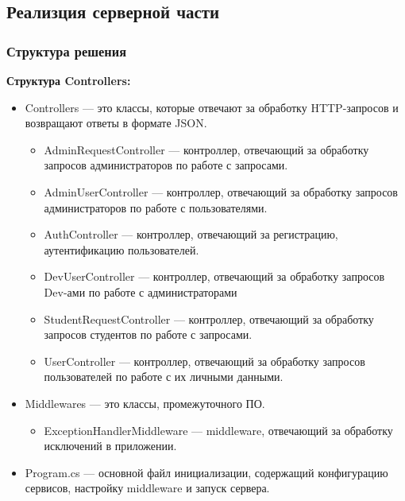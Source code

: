 \subsection{Реализция серверной части}

\subsubsection{Структура решения}

\textbf{Структура Controllers:}
\begin{itemize}
	\item{Controllers --- это классы, которые отвечают за обработку HTTP-запросов и возвращают ответы в формате JSON.
			\begin{itemize}
				\item{AdminRequestController --- контроллер, отвечающий за обработку запросов администраторов по работе с запросами.}
				\item{AdminUserController --- контроллер, отвечающий за обработку запросов администраторов по работе с пользователями.}
				\item{AuthController --- контроллер, отвечающий за регистрацию, аутентификацию пользователей.}
				\item{DevUserController --- контроллер, отвечающий за обработку запросов Dev-ами по работе с администраторами}
				\item{StudentRequestController --- контроллер, отвечающий за обработку запросов студентов по работе с запросами.}
				\item{UserController --- контроллер, отвечающий за обработку запросов пользователей по работе с их личными данными.}
			\end{itemize}
		}
	\item{Middlewares --- это классы, промежуточного ПО.
			\begin{itemize}
				\item{ExceptionHandlerMiddleware --- middleware, отвечающий за обработку исключений в приложении.}
			\end{itemize}
		}
	\item{Program.cs --- основной файл инициализации, содержащий конфигурацию сервисов, настройку middleware и запуск сервера.}
\end{itemize}

